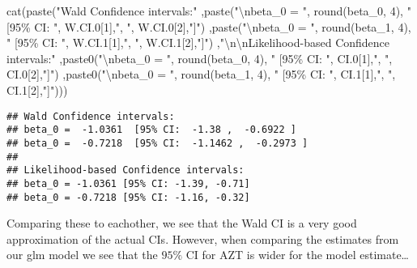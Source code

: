 \documentclass[
]{article}
\newenvironment{Shaded}{\begin{snugshade}}{\end{snugshade}}
\newcommand{\DecValTok}[1]{\textcolor[rgb]{0.00,0.00,0.81}{#1}}
\newcommand{\FloatTok}[1]{\textcolor[rgb]{0.00,0.00,0.81}{#1}}
\newcommand{\FunctionTok}[1]{\textcolor[rgb]{0.00,0.00,0.00}{#1}}
\newcommand{\NormalTok}[1]{#1}
\newcommand{\SpecialCharTok}[1]{\textcolor[rgb]{0.00,0.00,0.00}{#1}}
\newcommand{\StringTok}[1]{\textcolor[rgb]{0.31,0.60,0.02}{#1}}
\begin{document}
\begin{Shaded}
\begin{Highlighting}[]
\FunctionTok{cat}\NormalTok{(}\FunctionTok{paste}\NormalTok{(}\StringTok{"Wald Confidence intervals:"}
\NormalTok{      ,}\FunctionTok{paste}\NormalTok{(}\StringTok{"}\SpecialCharTok{\textbackslash{}n}\StringTok{beta\_0 = "}\NormalTok{, }\FunctionTok{round}\NormalTok{(beta\_0, }\DecValTok{4}\NormalTok{), }\StringTok{" [95\% CI: "}\NormalTok{, W.CI}\FloatTok{.0}\NormalTok{[}\DecValTok{1}\NormalTok{],}\StringTok{", "}\NormalTok{, W.CI}\FloatTok{.0}\NormalTok{[}\DecValTok{2}\NormalTok{],}\StringTok{"]"}\NormalTok{)}
\NormalTok{      ,}\FunctionTok{paste}\NormalTok{(}\StringTok{"}\SpecialCharTok{\textbackslash{}n}\StringTok{beta\_0 = "}\NormalTok{, }\FunctionTok{round}\NormalTok{(beta\_1, }\DecValTok{4}\NormalTok{), }\StringTok{" [95\% CI: "}\NormalTok{, W.CI}\FloatTok{.1}\NormalTok{[}\DecValTok{1}\NormalTok{],}\StringTok{", "}\NormalTok{, W.CI}\FloatTok{.1}\NormalTok{[}\DecValTok{2}\NormalTok{],}\StringTok{"]"}\NormalTok{)}
\NormalTok{      ,}\StringTok{"}\SpecialCharTok{\textbackslash{}n\textbackslash{}n}\StringTok{Likelihood{-}based Confidence intervals:"}
\NormalTok{      ,}\FunctionTok{paste0}\NormalTok{(}\StringTok{"}\SpecialCharTok{\textbackslash{}n}\StringTok{beta\_0 = "}\NormalTok{, }\FunctionTok{round}\NormalTok{(beta\_0, }\DecValTok{4}\NormalTok{), }\StringTok{" [95\% CI: "}\NormalTok{, CI}\FloatTok{.0}\NormalTok{[}\DecValTok{1}\NormalTok{],}\StringTok{", "}\NormalTok{, CI}\FloatTok{.0}\NormalTok{[}\DecValTok{2}\NormalTok{],}\StringTok{"]"}\NormalTok{)}
\NormalTok{      ,}\FunctionTok{paste0}\NormalTok{(}\StringTok{"}\SpecialCharTok{\textbackslash{}n}\StringTok{beta\_0 = "}\NormalTok{, }\FunctionTok{round}\NormalTok{(beta\_1, }\DecValTok{4}\NormalTok{), }\StringTok{" [95\% CI: "}\NormalTok{, CI}\FloatTok{.1}\NormalTok{[}\DecValTok{1}\NormalTok{],}\StringTok{", "}\NormalTok{, CI}\FloatTok{.1}\NormalTok{[}\DecValTok{2}\NormalTok{],}\StringTok{"]"}\NormalTok{)))}
\end{Highlighting}
\end{Shaded}

\begin{verbatim}
## Wald Confidence intervals: 
## beta_0 =  -1.0361  [95% CI:  -1.38 ,  -0.6922 ] 
## beta_0 =  -0.7218  [95% CI:  -1.1462 ,  -0.2973 ] 
## 
## Likelihood-based Confidence intervals: 
## beta_0 = -1.0361 [95% CI: -1.39, -0.71] 
## beta_0 = -0.7218 [95% CI: -1.16, -0.32]
\end{verbatim}

Comparing these to eachother, we see that the Wald CI is a very good
approximation of the actual CIs. However, when comparing the estimates
from our glm model we see that the \(95\%\) CI for AZT is wider for the
model estimate\ldots{}
\end{document}
